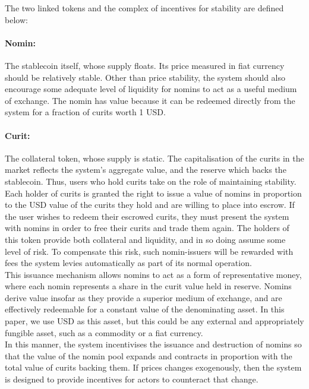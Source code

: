 \noindent The two linked tokens and the complex of incentives for stability are defined below:

\paragraph{Nomin:} The stablecoin itself, whose supply floats. Its price measured in fiat currency should be relatively stable.
Other than price stability, the system should also encourage some adequate level of liquidity for nomins
to act as a useful medium of exchange. The nomin has value because it can be redeemed directly from the system for a fraction of curits worth 1 USD.

\paragraph{Curit:} The collateral token, whose supply is static.
The capitalisation of the curits in the market reflects the system's aggregate value, and the reserve
which backs the stablecoin. Thus, users who hold curits take on the role of maintaining stability. \\

\noindent Each holder of curits is granted the right to issue a value of nomins in proportion to the USD value
of the curits they hold and are willing to place into escrow. If the user wishes to redeem their escrowed curits, they must
present the system with nomins in order to free their curits and trade them again.
The holders of this token provide both collateral and liquidity, and in so doing assume some
level of risk. To compensate this risk, such nomin-issuers will be rewarded with fees the system levies
automatically as part of its normal operation. \\

\noindent This issuance mechanism allows nomins to act as a form of representative money, where 
each nomin represents a share in the curit value held in reserve. Nomins derive value insofar as they provide
a superior medium of exchange, and are effectively redeemable for a constant value
of the denominating asset. In this paper, we use USD as this asset, but this could be any external
and appropriately fungible asset, such as a commodity or a fiat currency.  \\

\noindent In this manner, the system incentivises the issuance and destruction of nomins so that the value of
the nomin pool expands and contracts in proportion with the total value of curits backing them.
If prices changes exogenously, then the system is designed to provide incentives for actors to
counteract that change. \\

